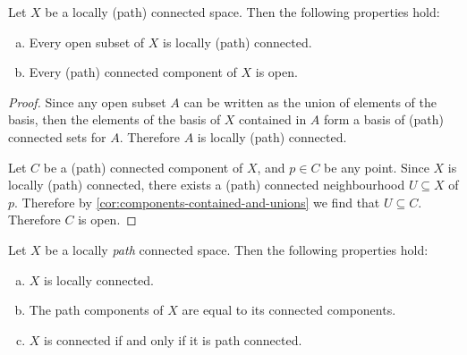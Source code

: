 \begin{proposition}
    \label{prop:locally-conn-space-properties}
    Let \(X\) be a locally (path) connected space. Then the following properties
    hold:
    \begin{enumerate}[(a)]\setlength\itemsep{0em}
        \item Every open subset of \(X\) is locally (path) connected.

        \item Every (path) connected component of \(X\) is open.
    \end{enumerate}
\end{proposition}

\begin{proof}
    Since any open subset \(A\) can be written as the union of elements of the
    basis, then the elements of the basis of \(X\) contained in \(A\) form a basis
    of (path) connected sets for \(A\). Therefore \(A\) is locally (path) connected.

    Let \(C\) be a (path) connected component of \(X\), and \(p \in C\) be any
    point. Since \(X\) is locally (path) connected, there exists a (path) connected
    neighbourhood \(U \subseteq X\) of \(p\). Therefore by
    \cref{cor:components-contained-and-unions} we find that \(U \subseteq
    C\). Therefore \(C\) is open.
\end{proof}

\begin{proposition}
    \label{prop:locally-path-conn-space-properties}
    Let \(X\) be a locally \emph{path} connected space. Then the following
    properties hold:
    \begin{enumerate}[(a)]\setlength\itemsep{0em}
        \item \(X\) is locally connected.

        \item The path components of \(X\) are equal to its connected components.

        \item \(X\) is connected if and only if it is path connected.
    \end{enumerate}
\end{proposition}


